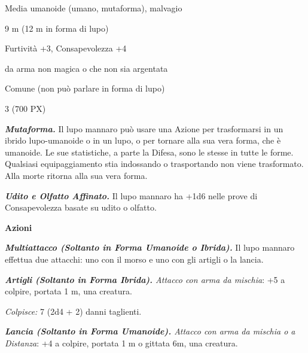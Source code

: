 \begin{multicols}{2}
{
\begin{description}[noitemsep, topsep=0pt, parsep=0pt, partopsep=0pt, itemsep=1pt, leftmargin=2.35cm,  labelwidth=2.2cm, itemindent=0cm, listparindent=0pt] %
\setlength{\baselineskip}{10pt}
\item[\textbf{Taglia/Tipo}] Media umanoide (umano, mutaforma), malvagio
\item[\textbf{Caratt.}] 
\item[\textbf{Punti Ferita}] 
\item[\textbf{Movimento}] 9 m (12 m in forma di lupo)
\item[\textbf{Tiri Salvez.}] 
\item[\textbf{Comp.}] Furtività +3, Consapevolezza +4
\item[\textbf{Imm. Danni}] da arma non magica o che non sia argentata
\item[\textbf{Linguaggi}] Comune (non può parlare in forma di lupo)
\item[\textbf{Sfida}] 3 (700 PX)
\end{description}
\smallskip

\emph{\textbf{Mutaforma.}} Il lupo mannaro può usare una Azione per trasformarsi in un ibrido lupo-umanoide o in un lupo, o per tornare alla sua vera forma, che è umanoide. Le sue statistiche, a parte la Difesa, sono le stesse in tutte le forme. Qualsiasi equipaggiamento stia indossando o trasportando non viene trasformato. Alla morte ritorna alla sua vera forma.

\emph{\textbf{Udito e Olfatto Affinato.}} Il lupo mannaro ha +1d6 nelle prove di Consapevolezza basate su udito o olfatto.

\textbf{Azioni}

\emph{\textbf{Multiattacco (Soltanto in Forma Umanoide o Ibrida).}} Il lupo mannaro effettua due attacchi: uno con il morso e uno con gli artigli o la lancia.

\emph{\textbf{Artigli (Soltanto in Forma Ibrida).} Attacco con arma da mischia}: +5 a colpire, portata 1 m, una creatura.

\emph{Colpisce:} 7 (2d4 + 2) danni taglienti.

\emph{\textbf{Lancia (Soltanto in Forma Umanoide).} Attacco con arma da mischia o a Distanza}: +4 a colpire, portata 1 m o gittata 6m, una creatura.

}
\end{multicols}
